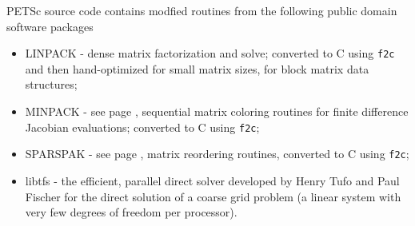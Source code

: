 \vspace{.3in}
\noindent
PETSc source code contains modfied routines from the following public domain software packages
\begin{itemize}
  \item LINPACK -    dense matrix factorization and solve; converted to C using {\tt f2c} and then
                     hand-optimized for small matrix sizes, for block matrix data structures;
  \item MINPACK -    see page \pageref{sec_fdmatrix}, sequential matrix coloring routines for finite difference Jacobian
                     evaluations; converted to C using {\tt f2c};
  \item SPARSPAK -   see page \pageref{sec_factorization}, matrix reordering routines, converted to C using {\tt f2c};
  \item libtfs     - the efficient, parallel direct solver developed by Henry Tufo and Paul Fischer for the direct solution of a coarse grid problem
                     (a linear system with very few degrees of freedom per processor).
\end{itemize}


